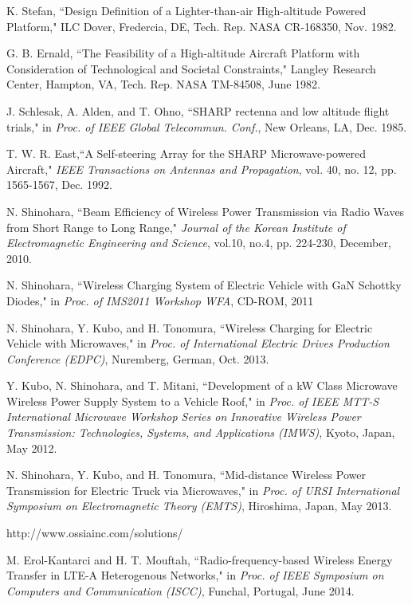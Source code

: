 \documentclass[twocolumn,10pt]{IEEEtran}
\begin{document}
\begin{thebibliography}{99}
  K. Stefan, ``Design Definition of a Lighter-than-air High-altitude Powered Platform," ILC Dover, Fredercia, DE, Tech. Rep. NASA CR-168350, Nov. 1982.

  G. B. Ernald, ``The Feasibility of a High-altitude Aircraft Platform with Consideration of Technological and Societal Constraints," Langley Research Center, Hampton, VA, Tech. Rep. NASA TM-84508, June 1982.

J. Schlesak, A. Alden, and T. Ohno, ``SHARP rectenna and low altitude flight trials," in \emph{Proc. of IEEE Global Telecommun. Conf.}, New Orleans, LA, Dec. 1985.

T. W. R. East,``A Self-steering Array for the SHARP Microwave-powered Aircraft," \emph{IEEE Transactions on Antennas and Propagation}, vol. 40, no. 12, pp.	1565-1567, Dec. 1992. 

  N. Shinohara, ``Beam Efficiency of Wireless Power Transmission via Radio Waves from Short Range to Long Range," \emph{Journal of the Korean Institute of Electromagnetic Engineering and Science}, vol.10, no.4, pp. 224-230, December, 2010.
 
  N. Shinohara, ``Wireless Charging System of Electric Vehicle with GaN Schottky Diodes," in \emph{Proc. of IMS2011 Workshop WFA}, CD-ROM, 2011

  N. Shinohara, Y. Kubo, and H. Tonomura, ``Wireless Charging for Electric Vehicle with Microwaves," in \emph{Proc. of International Electric Drives Production Conference (EDPC)}, Nuremberg, German, Oct.  2013.
 
 Y. Kubo, N. Shinohara, and T. Mitani,              
``Development of a kW Class Microwave Wireless Power Supply System to a Vehicle Roof,"  in \emph{Proc. of IEEE MTT-S International Microwave Workshop Series on Innovative Wireless Power Transmission: Technologies, Systems, and Applications (IMWS)}, Kyoto, Japan, May 2012.
 
 N. Shinohara, Y. Kubo, and H. Tonomura,  
``Mid-distance Wireless Power Transmission for Electric Truck via Microwaves," in \emph{Proc. of URSI International Symposium on Electromagnetic Theory (EMTS)}, Hiroshima, Japan, May 2013.



http://www.ossiainc.com/solutions/

M. Erol-Kantarci and H. T. Mouftah, ``Radio-frequency-based Wireless Energy Transfer in LTE-A Heterogenous Networks,"  in \emph{Proc. of IEEE Symposium on Computers and Communication (ISCC)}, Funchal, Portugal, June 2014. 


\end{thebibliography}
\end{document}
